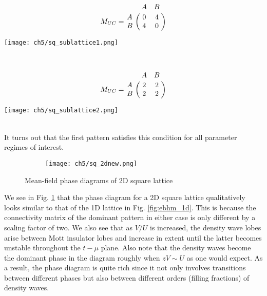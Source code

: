 \begin{minipage}{0.4\linewidth}
    \begin{equation*}
        M_{UC} =  \bordermatrix{ & A & B \cr
        A & 0 & 4 \cr
        B & 4 & 0 }
    \end{equation*}
\end{minipage}%
\hfill
\begin{minipage}{0.5\linewidth}
\centering
\vspace{0.2cm}
\texttt{[image: ch5/sq\_sublattice1.png]}
\end{minipage}
\vspace{0.5cm}\\
\begin{minipage}{0.4\linewidth}
    \begin{equation*}
        M_{UC} =  \bordermatrix{ & A & B \cr
        A & 2 & 2 \cr
        B & 2 & 2 }
    \end{equation*}
\end{minipage}%
\hfill
\begin{minipage}{0.5\linewidth}
\centering
\vspace{0.2cm}
\texttt{[image: ch5/sq\_sublattice2.png]}
\end{minipage}
\vspace{0.3cm}\\
It turns out that the first pattern satisfies this condition for all parameter regimes of interest. 
\vspace{-0.4cm}
\begin{figure}[!htb]
    \centering
    \begin{subfigure}[b]{0.77\textwidth}  %
        \centering
        \texttt{[image: ch5/sq\_2dnew.png]}
    \end{subfigure}
    \caption{Mean-field phase diagrams of 2D square lattice}
    \label{fig:ebhm_sq}
\end{figure}
\FloatBarrier \!\!\!\!\!\!\!\!\!\!\!

We see in Fig. \ref{fig:ebhm_sq} that the phase diagram for a 2D square lattice qualitatively looks similar to that of the 1D lattice in Fig. \ref{fig:ebhm_1d}. This is because the connectivity matrix of the dominant pattern in either case is only different by a scaling factor of two. We also see that as $V/U$ is increased, the density wave lobes arise between Mott insulator lobes and increase in extent until the latter becomes unstable throughout the $t-\mu$ plane. Also note that the density waves become the dominant phase in the diagram roughly when $zV \sim U$ as one would expect. As a result, the phase diagram is quite rich since it not only involves transitions between different phases but also between different orders (filling fractions) of density waves.

